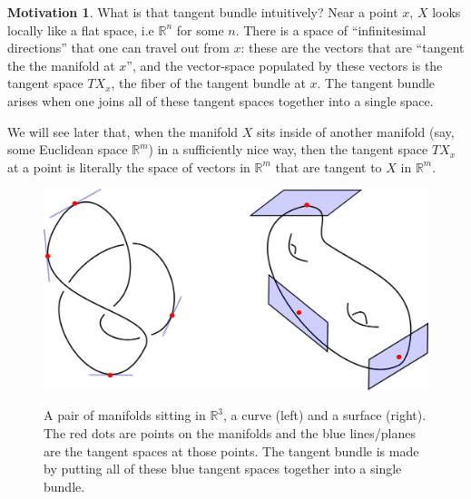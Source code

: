 \documentclass[12pt]{article}
\theoremstyle{definition}
\newtheorem{motivation}[theorem]{Motivation}
\numberwithin{equation}{section}
\newcommand{\R}{{\mathbb R}}
\begin{document}
\begin{motivation} What is that tangent bundle intuitively? Near a point $x$, $X$ looks locally like a flat space, i.e $\R^n$ for some $n$. There is a space of ``infinitesimal directions'' that one can travel out from $x$: these are the vectors that are ``tangent the the manifold at $x$'', and the vector-space populated by these vectors is the tangent space $TX_x$, the fiber of the tangent bundle at $x$. The tangent bundle arises when one joins all of these tangent spaces together into a single space.

We will see later that, when the manifold $X$ sits inside of another manifold (say, some Euclidean space $\R^m$) in a sufficiently nice way, then the tangent space $TX_x$ at a point is literally the space of vectors in $\R^m$ that are tangent to $X$ in $\R^m$. \end{motivation}

\begin{figure}[h]
    \centering
    \includegraphics[width=.9\textwidth]{reu_figures/tangent_bundles.png}
    \label{fig:tangent_bundle}
    \caption{A pair of manifolds sitting in $\R^3$, a curve (left) and a surface (right). The red dots are points on the manifolds and the blue lines/planes are the tangent spaces at those points. The tangent bundle is made by putting all of these blue tangent spaces together into a single bundle.}
\end{figure}
\end{document}

